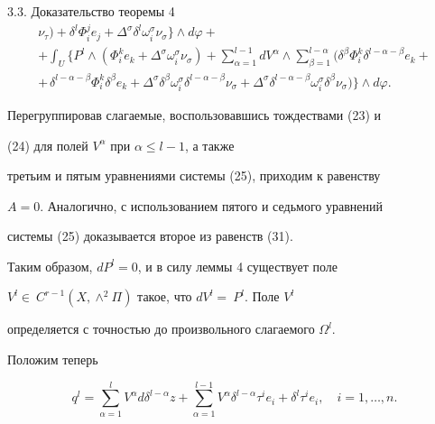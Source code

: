 \begin{pf*}{3.3. Доказательство теоремы 4}
\begin{multline*}
\nu_{\tau})+\delta^l\Phi^j_ie_j+\Delta^{\sigma}\delta^l


\omega^{\sigma}_i\nu_{\sigma}\biggr\}\wedge d\varphi+\\


+\int_{U}\biggl\{P^l\wedge(\Phi^k_ie_k+\Delta^{\sigma}\omega^{\sigma}_i


\nu_{\sigma})+


\sum_{\alpha=1}^{l-1}dV^{\alpha}\wedge\sum_{\beta=1}^{l-\alpha}(


\delta^{\beta}\Phi^k_i\delta^{l-\alpha-\beta}e_k+\\


+\frac{}{}\delta^{l-\alpha-\beta}\Phi^k_i\delta^{\beta}e_k+


\Delta^{\sigma}\delta^{\beta}\omega^{\sigma}_i


\delta^{l-\alpha-\beta}\nu_{\sigma}+\Delta^{\sigma}


\delta^{l-\alpha-\beta}\omega^{\sigma}_i\delta^{\beta}


\nu_{\sigma})\biggr\}\wedge d\varphi.


\end{multline*}


Перегруппировав слагаемые, воспользовавшись тождествами (23) и


(24) для полей $V^{\alpha}$ при $\alpha\le l-1$, а также


третьим и пятым уравнениями системы (25), приходим к равенству


$A=0$. Аналогично, с использованием пятого и седьмого уравнений


системы (25) доказывается второе из равенств (31).





Таким образом, $dP^l=0$, и в силу леммы 4 существует поле


$V^l\in~C^{r-1}(X,\wedge^2\Pi)$ такое, что $dV^l=~P^l$. Поле $V^l$


определяется с точностью до произвольного слагаемого $\Omega^l$.


Положим теперь


\begin{equation}


q^l=\sum_{\alpha=1}^{l}V^{\alpha}d\delta^{l-\alpha}z+


\sum_{\alpha=1}^{l-1}V^{\alpha}\delta^{l-\alpha}\tau^ie_i+


\delta^l\tau^ie_i,\quad i=1,\dotsc,n.


\end{equation}



\end{pf*}
